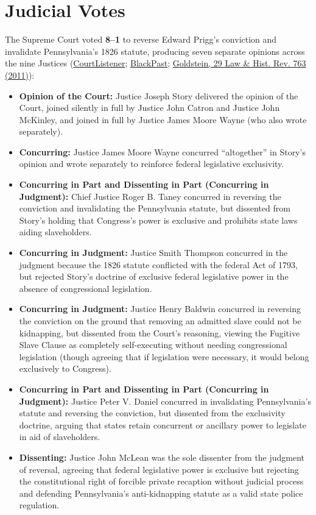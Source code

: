 \documentclass[12pt]{article}
\begin{document}
\section{Judicial Votes}
The Supreme Court voted \textbf{8--1} to reverse Edward Prigg's conviction and invalidate Pennsylvania's 1826 statute, producing seven separate opinions across the nine Justices (\href{https://www.courtlistener.com/opinion/86231/prigg-v-pennsylvania/}{CourtListener}; \href{https://blackpast.org/african-american-history/prigg-v-pennsylvania-1842/}{BlackPast}; \href{https://www.cambridge.org/core/journals/law-and-history-review/article/triumph-of-freedom-after-all-prigg-v-pennsylvania-reexamined/A0B7452002A367E4EFE865A3375F9D0E}{Goldstein, 29 Law \& Hist. Rev. 763 (2011)}):
\begin{itemize}
\item \textbf{Opinion of the Court:} Justice Joseph Story delivered the opinion of the Court, joined silently in full by Justice John Catron and Justice John McKinley, and joined in full by Justice James Moore Wayne (who also wrote separately).
\item \textbf{Concurring:} Justice James Moore Wayne concurred ``altogether'' in Story's opinion and wrote separately to reinforce federal legislative exclusivity.
\item \textbf{Concurring in Part and Dissenting in Part (Concurring in Judgment):} Chief Justice Roger B. Taney concurred in reversing the conviction and invalidating the Pennsylvania statute, but dissented from Story's holding that Congress's power is exclusive and prohibits state laws aiding slaveholders.
\item \textbf{Concurring in Judgment:} Justice Smith Thompson concurred in the judgment because the 1826 statute conflicted with the federal Act of 1793, but rejected Story's doctrine of exclusive federal legislative power in the absence of congressional legislation.
\item \textbf{Concurring in Judgment:} Justice Henry Baldwin concurred in reversing the conviction on the ground that removing an admitted slave could not be kidnapping, but dissented from the Court's reasoning, viewing the Fugitive Slave Clause as completely self-executing without needing congressional legislation (though agreeing that if legislation were necessary, it would belong exclusively to Congress).
\item \textbf{Concurring in Part and Dissenting in Part (Concurring in Judgment):} Justice Peter V. Daniel concurred in invalidating Pennsylvania's statute and reversing the conviction, but dissented from the exclusivity doctrine, arguing that states retain concurrent or ancillary power to legislate in aid of slaveholders.
\item \textbf{Dissenting:} Justice John McLean was the sole dissenter from the judgment of reversal, agreeing that federal legislative power is exclusive but rejecting the constitutional right of forcible private recaption without judicial process and defending Pennsylvania's anti-kidnapping statute as a valid state police regulation.
\end{itemize}
\end{document}
